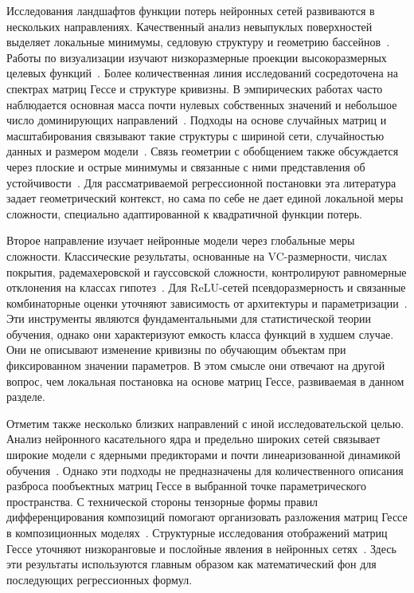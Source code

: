 Исследования ландшафтов функции потерь нейронных сетей развиваются в нескольких направлениях. Качественный анализ невыпуклых поверхностей выделяет локальные минимумы, седловую структуру и геометрию бассейнов~\cite{choromanska2015, fort2019emergent}. Работы по визуализации изучают низкоразмерные проекции высокоразмерных целевых функций~\cite{li2018visualizing, fort2019large}. Более количественная линия исследований сосредоточена на спектрах матриц Гессе и структуре кривизны. В эмпирических работах часто наблюдается основная масса почти нулевых собственных значений и небольшое число доминирующих направлений~\cite{pmlr-v97-ghorbani19b, sagun2018empiricalanalysishessianoverparametrized, papyan2019spectrumdeepnethessiansscale, wu2022dissecting}. Подходы на основе случайных матриц и масштабирования связывают такие структуры с шириной сети, случайностью данных и размером модели~\cite{pennington2017spectrum, xie2022powerlaw}. Связь геометрии с обобщением также обсуждается через плоские и острые минимумы и связанные с ними представления об устойчивости~\cite{hochreiter1997flat, neyshabur2017exploring, dinh2017sharp}. Для рассматриваемой регрессионной постановки эта литература задает геометрический контекст, но сама по себе не дает единой локальной меры сложности, специально адаптированной к квадратичной функции потерь.

Второе направление изучает нейронные модели через глобальные меры сложности. Классические результаты, основанные на VC-размерности, числах покрытия, радемахеровской и гауссовской сложности, контролируют равномерные отклонения на классах гипотез~\cite{vapnik1998, bartlett2002rademacher}. Для ReLU-сетей псевдоразмерность и связанные комбинаторные оценки уточняют зависимость от архитектуры и параметризации~\cite{harvey2019jmlr}. Эти инструменты являются фундаментальными для статистической теории обучения, однако они характеризуют емкость класса функций в худшем случае. Они не описывают изменение кривизны по обучающим объектам при фиксированном значении параметров. В этом смысле они отвечают на другой вопрос, чем локальная постановка на основе матриц Гессе, развиваемая в данном разделе.

Отметим также несколько близких направлений с иной исследовательской целью. Анализ нейронного касательного ядра и предельно широких сетей связывает широкие модели с ядерными предикторами и почти линеаризованной динамикой обучения~\cite{NEURIPS2018_5a4be1fa, lee2018wide}. Однако эти подходы не предназначены для количественного описания разброса пообъектных матриц Гессе в выбранной точке параметрического пространства. С технической стороны тензорные формы правил дифференцирования композиций помогают организовать разложения матриц Гессе в композиционных моделях~\cite{skorski2019chainruleshessianhigher}. Структурные исследования отображений матриц Гессе уточняют низкоранговые и послойные явления в нейронных сетях~\cite{wu2022dissecting}. Здесь эти результаты используются главным образом как математический фон для последующих регрессионных формул.

